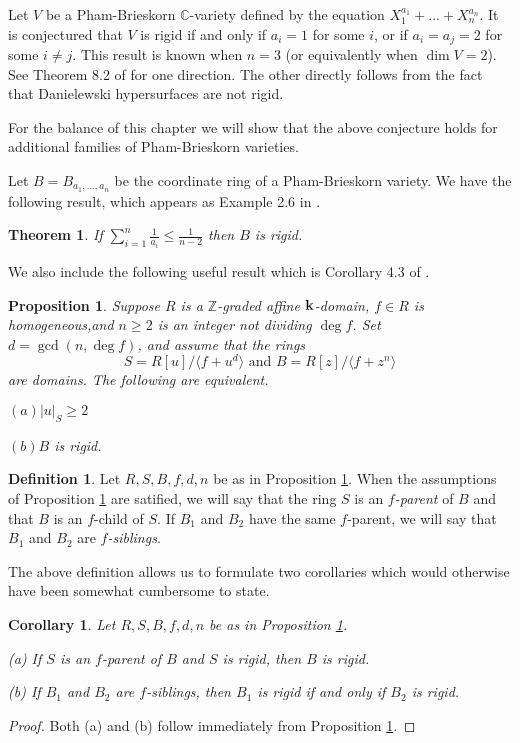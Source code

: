 \documentclass[12pt]{amsart}
\theoremstyle{plain}
\newtheorem{theorem}[subsection]{Theorem}
\newtheorem{proposition}[subsection]{Proposition}
\newtheorem{corollary}[subsection]{Corollary}
\theoremstyle{definition}
\newtheorem{definition}[subsection]{Definition}
\newcommand{\lb}{\langle}
\newcommand{\rb}{\rangle}
\newcommand{\Integ}{\ensuremath{\mathbb{Z}}}
\newcommand{\Comp}{\ensuremath{\mathbb{C}}}
\newcommand{\bk}{{\ensuremath{\rm \bf k}}}
\begin{document}
	Let $V$ be a Pham-Brieskorn $\Comp$-variety defined by the equation $X_1^{a_1} + ... + X_n^{a_n}$. It is conjectured that $V$ is rigid if and only if $a_i = 1$ for some $i$, or if $a_i = a_j = 2$ for some $i \neq j$. This result is known when $n = 3$ (or equivalently when $\dim V = 2$). See Theorem 8.2 of \cite{freudenburg2013} for one direction. The other directly follows from the fact that Danielewski hypersurfaces are not rigid.   
	
	For the balance of this chapter we will show that the above conjecture holds for additional families of Pham-Brieskorn varieties.
	
	Let $B = B_{a_1, ..., a_n}$ be the coordinate ring of a Pham-Brieskorn variety. We have the following result, which appears as Example 2.6 in \cite{almostRigidRings}. 
	
	\begin{theorem}\label{lowSum} If $\sum\limits_{i=1}^n \frac{1}{a_i} \leq \frac{1}{n-2}$ then $B$ is rigid. 
	\end{theorem} 
	
	We also include the following useful result which is Corollary 4.3 of \cite{freudenburg2013}.
	
	\begin{proposition} \label{rigidDegree2}
		Suppose $R$ is a $\Integ$-graded affine $\bk$-domain, $f \in R$ is homogeneous,and $n \geq 2$ is an integer not dividing $\deg f$. Set $d = \gcd(n, \deg f)$, and assume that the rings
		$$ S = R[u] / \lb f + u^d \rb \text{ and } B = R[z] / \lb f + z^n \rb$$
		are domains. The following are equivalent.
		
		$(a) |u|_S \geq 2$
		
		$(b) B$ is rigid. 
	\end{proposition}
	
	\begin{definition}
		Let $R,S,B,f,d,n$ be as in Proposition \ref{rigidDegree2}. When the assumptions of Proposition \ref{rigidDegree2} are satified, we will say that the ring $S$ is an \textit{$f$-parent} of $B$ and that $B$ is an $f$-child of $S$. If $B_1$ and $B_2$ have the same $f$-parent, we will say that $B_1$ and $B_2$ are \textit{$f$-siblings}.   
	\end{definition}
	
	The above definition allows us to formulate two corollaries which would otherwise have been somewhat cumbersome to state. 
	
	\begin{corollary}
		Let $R,S,B,f,d,n$ be as in Proposition \ref{rigidDegree2}. 
		
		(a) If $S$ is an $f$-parent of $B$ and $S$ is rigid, then $B$ is rigid. 
		
		(b) If $B_1$ and $B_2$ are $f$-siblings, then $B_1$ is rigid if and only if $B_2$ is rigid. 
	\end{corollary}
	\begin{proof}
		Both (a) and (b) follow immediately from Proposition \ref{rigidDegree2}. 
	\end{proof}
	
\end{document}
